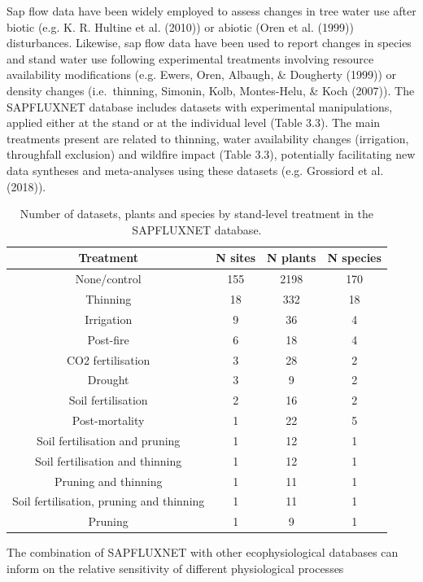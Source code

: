 \documentclass[11pt,twoside]{reedthesis}
\begin{document}
Sap flow data have been widely employed to assess changes in tree water
use after biotic (e.g. K. R. Hultine et al. (2010)) or abiotic (Oren et
al. (1999)) disturbances. Likewise, sap flow data have been used to
report changes in species and stand water use following experimental
treatments involving resource availability modifications (e.g. Ewers,
Oren, Albaugh, \& Dougherty (1999)) or density changes (i.e.~thinning,
Simonin, Kolb, Montes-Helu, \& Koch (2007)). The SAPFLUXNET database
includes datasets with experimental manipulations, applied either at the
stand or at the individual level (Table 3.3). The main treatments
present are related to thinning, water availability changes (irrigation,
throughfall exclusion) and wildfire impact (Table 3.3), potentially
facilitating new data syntheses and meta-analyses using these datasets
(e.g. Grossiord et al. (2018)).\par
\begin{table}[!h]

\caption[Number of datasets, plants and species by stand-level treatment in the SAPFLUXNET database.]{\label{tab:Ch3T3}Number of datasets, plants and species by stand-level treatment in the SAPFLUXNET database.}
\centering
\fontsize{10}{12}\selectfont
\begin{tabular}[t]{cccc}
\toprule
Treatment & N sites & N plants & N species\\
\midrule
None/control & 155 & 2198 & 170\\
Thinning & 18 & 332 & 18\\
Irrigation & 9 & 36 & 4\\
Post-fire & 6 & 18 & 4\\
CO2 fertilisation & 3 & 28 & 2\\
Drought & 3 & 9 & 2\\
Soil fertilisation & 2 & 16 & 2\\
Post-mortality & 1 & 22 & 5\\
Soil fertilisation and pruning & 1 & 12 & 1\\
Soil fertilisation and thinning & 1 & 12 & 1\\
Pruning and thinning & 1 & 11 & 1\\
Soil fertilisation, pruning and thinning & 1 & 11 & 1\\
Pruning & 1 & 9 & 1\\
\bottomrule
\end{tabular}
\end{table}
The combination of SAPFLUXNET with other ecophysiological databases can
inform on the relative sensitivity of different physiological processes
\end{document}
